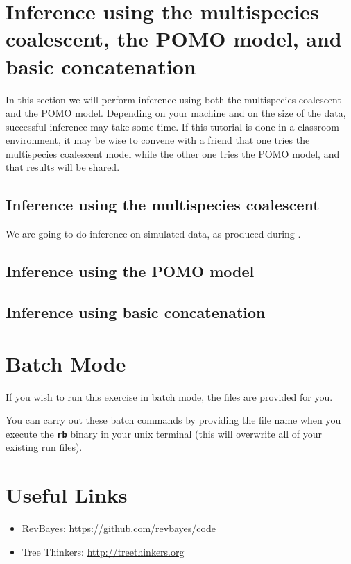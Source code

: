 \documentclass[11pt]{article}
\newcommand{\cl}[1]{{\texttt{\textbf{#1}}}}
\begin{document}
\bigskip
\section*{Inference using the multispecies coalescent, the POMO model, and basic concatenation}
In this section we will perform inference using both the multispecies coalescent and the POMO model.
Depending on your machine and on the size of the data, successful inference may take some time.
If this tutorial is done in a classroom environment, it may be wise to convene with a friend that one tries the multispecies coalescent model while the other one tries the POMO model, and that results will be shared.

\subsection*{Inference using the multispecies coalescent }
We are going to do inference on simulated data, as produced during .


\subsection*{Inference using the POMO model }


\subsection*{Inference using basic concatenation }

\bigskip
\section*{Batch Mode}

If you wish to run this exercise in batch mode, the files are provided for you. 

You can carry out these batch commands by providing the file name when you execute the \cl{rb} binary in your unix terminal (this will overwrite all of your existing run files).
\exs{\cl{\$ rb full\_analysis.Rev}}

\bigskip
\section*{Useful Links}

\begin{itemize}
\item RevBayes: \href{https://github.com/revbayes/code}{https://github.com/revbayes/code} \\ \vspace{-7mm}
\item Tree Thinkers: \href{http://treethinkers.org/}{http://treethinkers.org} \\ \vspace{-7mm}
\end{itemize}
\end{document}
